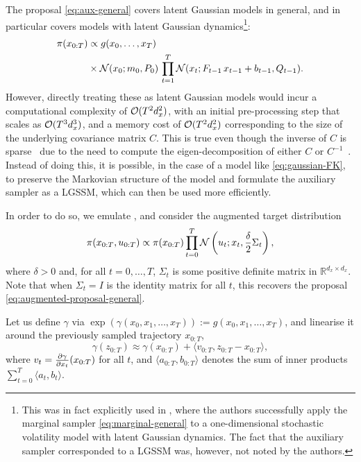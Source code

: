 The proposal \eqref{eq:aux-general} covers latent Gaussian models in general, and in particular covers models with latent Gaussian dynamics\footnote{This was in fact explicitly used in \citet[][Chap. 15]{Chopin2020book}, where the authors successfully apply the marginal sampler \eqref{eq:marginal-general} to a one-dimensional stochastic volatility model with latent Gaussian dynamics. The fact that the auxiliary sampler corresponded to a LGSSM was, however, not noted by the authors.}:
\begin{equation}
    \label{eq:gaussian-FK}
    \begin{split}
        \pi(x_{0:T})
        &\propto g(x_0, \ldots, x_T)\\
        &\times \mathcal{N}(x_0; m_0, P_0)\, \prod_{t=1}^T \mathcal{N}(x_t; F_{t-1}\, x_{t-1} + b_{t-1}, Q_{t-1}).
    \end{split}
\end{equation}
However, directly treating these as latent Gaussian models would incur a computational complexity of $\mathcal{O}(T^2 d_x^2)$, with an initial pre-processing step that scales as $\mathcal{O}(T^3 d_x^3)$, and a memory cost of $\mathcal{O}(T^2 d_x^2)$ corresponding to the size of the underlying covariance matrix $C$. This is true even though the inverse of $C$ is sparse~\citep[see, e.g.,][Chap. 3]{barfoot2017state} due to the need to compute the eigen-decomposition of either $C$ or $C^{-1}$~\citep[][Supplementary material]{titsias2018}. Instead of doing this, it is possible, in the case of a model like \eqref{eq:gaussian-FK}, to preserve the Markovian structure of the model and formulate the auxiliary sampler as a LGSSM, which can then be used more efficiently.

In order to do so, we emulate \citet{titsias2018}, and consider the augmented target distribution
\begin{equation}
    \label{eq:augmented-gaussian-fk}
    \pi(x_{0:T}, u_{0:T}) \propto \pi(x_{0:T}) \prod_{t=0}^T \mathcal{N}\left(u_t; x_{t}, \frac{\delta}{2} \Sigma_t\right),
\end{equation}
where $\delta > 0$ and, for all $t=0, \ldots, T$, $\Sigma_t$ is some positive definite matrix in $\mathbb{R}^{d_x \times d_x}$. Note that when $\Sigma_t = I$ is the identity matrix for all $t$, this recovers the proposal \eqref{eq:augmented-proposal-general}.

Let us define $\gamma$ via $\exp(\gamma(x_0, x_1, \ldots, x_T)) := g(x_0, x_1, \ldots, x_T)$, and linearise it around the previously sampled trajectory $x_{0:T}$,
\begin{equation}
    \label{eq:linearised-log-potential}
    \gamma(z_{0:T}) \approx \gamma(x_{0:T}) + \langle v_{0:T}, z_{0:T} - x_{0:T}\rangle,
\end{equation}
where $v_t = {\pdv{\gamma}{x_t}}(x_{0:T})$ for all $t$, and $\langle a_{0:T}, b_{0:T} \rangle$ denotes the sum of inner products $\sum_{t=0}^T \langle a_{t}, b_{t} \rangle$.

